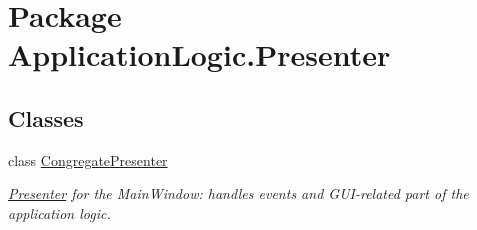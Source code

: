 \hypertarget{namespace_application_logic_1_1_presenter}{
\section{Package ApplicationLogic.Presenter}
\label{namespace_application_logic_1_1_presenter}
}
\subsection*{Classes}
\begin{DoxyCompactItemize}
\item 
class \hyperlink{class_application_logic_1_1_presenter_1_1_congregate_presenter}{CongregatePresenter}
\begin{DoxyCompactList}\small\item\em \hyperlink{namespace_application_logic_1_1_presenter}{Presenter} for the MainWindow: handles events and GUI-\/related part of the application logic. \item\end{DoxyCompactList}\end{DoxyCompactItemize}
